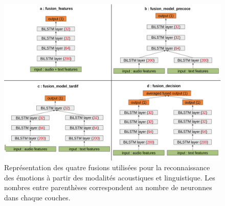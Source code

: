 \begin{figure}[thb]
  \centering
    \includegraphics[width=18cm]{./Chapitre6/figures/archi_fusion.png}
    \caption{Représentation des quatre fusions utilisées pour la reconnaissance des émotions à partir des modalités acoustiques et linguistique. Les nombres entre parenthèses correspondent au nombre de neuronnes dans chaque couches.}
    \label{fig:archi_fusion}
\end{figure}
